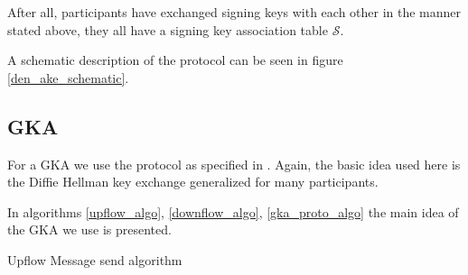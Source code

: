 \documentclass[]{article}
\begin{document}
After all, participants have exchanged signing keys with each other in the manner stated above, they all have a signing key association table $\mathcal{S}$.

A schematic description of the protocol can be seen in figure \ref{den_ake_schematic}.

\subsection{GKA}
\label{gka_subprot}
For a GKA we use the protocol as specified in \cite{mpenc}.
Again, the basic idea used here is the Diffie Hellman key exchange generalized for many participants.

In algorithms \ref{upflow_algo}, \ref{downflow_algo}, \ref{gka_proto_algo} the main idea of the GKA we use is presented.


\begin{algorithm}[h]
	\caption{Upflow Message send algorithm}
	\label{upflow_algo}
\end{algorithm}
\end{document}
